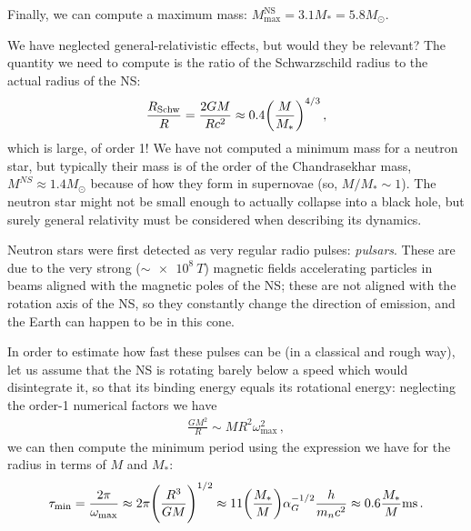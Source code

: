 \documentclass[main.tex]{subfiles}
\begin{document}
Finally, we can compute a maximum mass: \(M _{\text{max}}^{\text{NS}} = 3.1 M_{*} = 5.8 M_{\odot}\). 

We have neglected general-relativistic effects, but would they be relevant? The quantity we need to compute is the ratio of the Schwarzschild radius to the actual radius of the NS:
%
\begin{align}
\frac{R_{\text{Schw}}}{R} =
\frac{2GM}{Rc^2} \approx \num{.4} \qty(\frac{M}{M_{*}})^{4/3}
\,,
\end{align}
%
which is large, of order 1! We have not computed a minimum mass for a neutron star, but typically their mass is of the order of the Chandrasekhar mass, \(M^{NS} \approx 1.4 M_{\odot}\) because of how they form in supernovae (so, \(M / M_{*} \sim 1\)).
The neutron star might not be small enough to actually collapse into a black hole, but surely general relativity must be considered when describing its dynamics.

Neutron stars were first detected as very regular radio pulses: \emph{pulsars}. These are due to the very strong (\(\sim \SI{e8}{T}\)) magnetic fields accelerating particles in beams aligned with the magnetic poles of the NS; these are not aligned with the rotation axis of the NS, so they constantly change the direction of emission, and the Earth can happen to be in this cone. 

In order to estimate how fast these pulses can be (in a classical and rough way), let us assume that the NS is rotating barely below a speed which would disintegrate it, so that its binding energy equals its rotational energy: neglecting the order-1 numerical factors we have
%
\begin{align}
\frac{GM^2}{R} \sim M R^2 \omega^2 _{\text{max}}
\,,
\end{align}
%
we can then compute the minimum period using the expression we have for the radius in terms of \(M\) and \(M_{*}\):
%
\begin{align}
\tau _{\text{min}} = \frac{2 \pi }{\omega _{\text{max}}} 
\approx 2 \pi \qty(\frac{R^3}{GM})^{1/2}
\approx 
11 \qty(\frac{M_{*}}{M}) \alpha_{G}^{-1/2} \frac{h}{m_n c^2}
\approx \num{.6} \frac{M_{*}}{M} \SI{}{ms}
\,.
\end{align}
\end{document}
